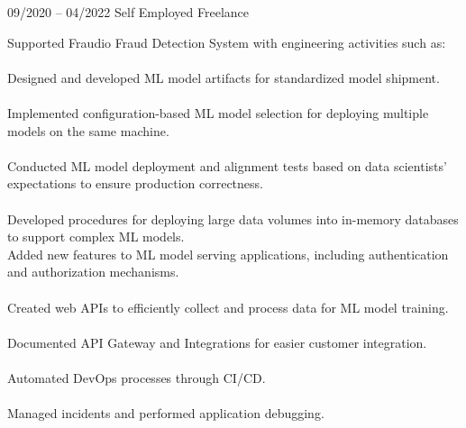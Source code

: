 \documentclass[9pt, green]{template/developercv} %
\begin{document}
{\begin{entrylist}
	\entry
	{09/2020 -- 04/2022 }
	{}
	{Self Employed \space\cpipe\space Freelance}
	{
		\vspace{0.3mm}
		\begin{minipage}[t]{0.75\textwidth}
			\vspace{-\baselineskip}
            Supported Fraudio Fraud Detection System with engineering activities such as:\\
            \vspace{-3mm}\\
            \itemmarker Designed and developed ML model artifacts for standardized model shipment.\\
            \vspace{-3mm}\\
            \itemmarker Implemented configuration-based ML model selection for deploying multiple models on the same machine.\\
            \vspace{-3mm}\\
            \itemmarker Conducted ML model deployment and alignment tests based on data scientists' expectations to ensure production correctness.\\
            \vspace{-3mm}\\
            \itemmarker Developed procedures for deploying large data volumes into in-memory databases to support complex ML models.\\
            \itemmarker Added new features to ML model serving applications, including authentication and authorization mechanisms.\\
            \vspace{-3mm}\\
            \itemmarker Created web APIs to efficiently collect and process data for ML model training.\\
            \vspace{-3mm}\\
            \itemmarker Documented API Gateway and Integrations for easier customer integration.\\
            \vspace{-3mm}\\
            \itemmarker Automated DevOps processes through CI/CD.\\
            \vspace{-3mm}\\
            \itemmarker Managed incidents and performed application debugging.\\
            \vspace{-3mm}\\
		\end{minipage}

}
\end{entrylist}}
\end{document}
